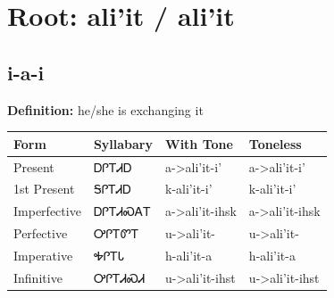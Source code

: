 \documentclass{article}%
\begin{document}
%
\normalsize%
\section*{Root: ali'it / ali'it}%
\subsection*{i-a-i}%
\textbf{Definition: }%
he/she is exchanging it%
\\[0.5em]%
\begin{tabular}{|l|l|l|l|}%
\hline%
\textbf{Form}&\textbf{Syllabary}&\textbf{With Tone}&\textbf{Toneless}\\%
\hline%
Present&ᎠᎵᎢᏗᎠ&a{-}>ali'it{-}i'&a{-}>ali'it{-}i'\\%
1st Present&ᎦᎵᎢᏗᎠ&k{-}ali'it{-}i'&k{-}ali'it{-}i'\\%
Imperfective&ᎠᎵᎢᏗᏍᎪᎢ&a{-}>ali'it{-}ihsk&a{-}>ali'it{-}ihsk\\%
Perfective&ᎤᎵᎢᏛᎢ&u{-}>ali'it{-}&u{-}>ali'it{-}\\%
Imperative&ᎭᎵᎢᏓ&h{-}ali'it{-}a&h{-}ali'it{-}a\\%
Infinitive&ᎤᎵᎢᏗᏍᏗ&u{-}>ali'it{-}ihst&u{-}>ali'it{-}ihst\\%
\hline%
\end{tabular}%
\\[1em]%
\end{document}
